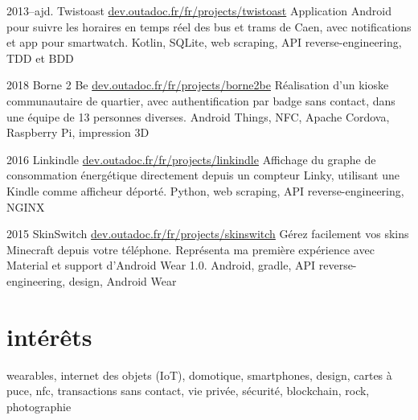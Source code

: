 \documentclass[]{friggeri-cv}
\begin{document}
\begin{entrylist}
	 \entry
	{2013--ajd.}
	{Twistoast}
	{\href{https://dev.outadoc.fr/fr/projects/twistoast}{dev.outadoc.fr/fr/projects/twistoast}}
	{Application Android pour suivre les horaires en temps réel des bus et trams de Caen, avec notifications et app pour smartwatch.}
	{Kotlin, SQLite, web scraping, API reverse-engineering, TDD et BDD}
	
	\entry
	{2018}
	{Borne 2 Be}
	{\href{https://dev.outadoc.fr/fr/projects/borne2be}{dev.outadoc.fr/fr/projects/borne2be}}
	{Réalisation d'un kioske communautaire de quartier, avec authentification par badge sans contact, dans une équipe de 13 personnes diverses.}
	{Android Things, NFC, Apache Cordova, Raspberry Pi, impression 3D}
	
	\entry
	{2016}
	{Linkindle}
	{\href{https://dev.outadoc.fr/fr/projects/linkindle}{dev.outadoc.fr/fr/projects/linkindle}}
	{Affichage du graphe de consommation énergétique directement depuis un compteur Linky, utilisant une Kindle comme afficheur déporté.}
	{Python, web scraping, API reverse-engineering, NGINX}
	
 	\entry
	{2015}
	{SkinSwitch}
	{\href{https://dev.outadoc.fr/fr/projects/skinswitch}{dev.outadoc.fr/fr/projects/skinswitch}}
	{Gérez facilement vos skins Minecraft depuis votre téléphone. Représenta ma première expérience avec Material et support d'Android Wear 1.0.}
	{Android, gradle, API reverse-engineering, design, Android Wear}
    
\end{entrylist}

\section{intérêts}

wearables, internet des objets (IoT), domotique, smartphones, design, cartes à puce, nfc, transactions sans contact, vie privée, sécurité, blockchain, rock, photographie
\end{document}

